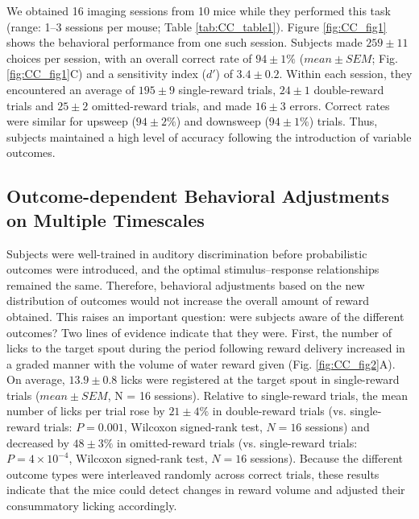 We obtained 16 imaging sessions from 10 mice while they performed this task (range: 1–3 sessions per mouse; Table \ref{tab:CC_table1}). Figure \ref{fig:CC_fig1} shows the behavioral performance from one such session. Subjects made $259 \pm 11$ choices per session, with an overall correct rate of $94 \pm 1\%$ ($mean \pm SEM$; Fig. \ref{fig:CC_fig1}C) and a sensitivity index ($d'$) of $3.4 \pm 0.2$. Within each session, they encountered an average of $195 \pm 9$ single-reward trials, $24 \pm 1$ double-reward trials and $25 \pm 2$ omitted-reward trials, and made $16 \pm 3$ errors. Correct rates were similar for upsweep ($94 \pm 2\%$) and downsweep ($94 \pm 1\%$) trials. Thus, subjects maintained a high level of accuracy following the introduction of variable outcomes.

\subsection[Outcome-dependent Behavioral Adjustments]
{Outcome-dependent Behavioral Adjustments on Multiple Timescales}
Subjects were well-trained in auditory discrimination before probabilistic outcomes were introduced, and the optimal stimulus–response relationships remained the same. Therefore, behavioral adjustments based on the new distribution of outcomes would not increase the overall amount of reward obtained. This raises an important question: were subjects aware of the different outcomes? Two lines of evidence indicate that they were. First, the number of licks to the target spout during the period following reward delivery increased in a graded manner with the volume of water reward given (Fig. \ref{fig:CC_fig2}A). On average, $13.9 \pm 0.8$ licks were registered at the target spout in single-reward trials ($mean \pm SEM$, N = 16 sessions). Relative to single-reward trials, the mean number of licks per trial rose by $21 \pm 4\%$ in double-reward trials (vs. single-reward trials: $P = 0.001$, Wilcoxon signed-rank test, $N = 16$ sessions) and decreased by $48 \pm 3\%$ in omitted-reward trials (vs. single-reward trials: $P = 4 \times 10^{-4}$, Wilcoxon signed-rank test, $N = 16$ sessions). Because the different outcome types were interleaved randomly across correct trials, these results indicate that the mice could detect changes in reward volume and adjusted their consummatory licking accordingly.



